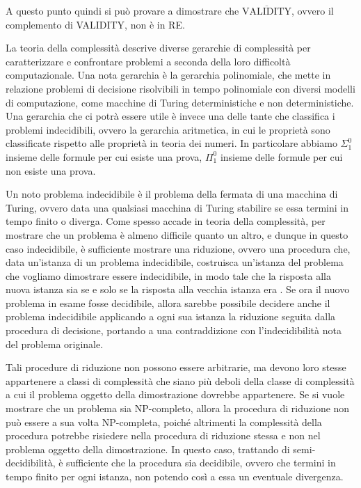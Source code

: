 A questo punto quindi si può provare a dimostrare che \(\overline{\text{VALIDITY}}\), ovvero il complemento di VALIDITY, non è in RE\@.

La teoria della complessità descrive diverse gerarchie di complessità per caratterizzare e confrontare problemi a seconda della loro difficoltà computazionale. Una nota gerarchia è la gerarchia polinomiale, che mette in relazione problemi di decisione risolvibili in tempo polinomiale con diversi modelli di computazione, come macchine di Turing deterministiche e non deterministiche. Una gerarchia che ci potrà essere utile è invece una delle tante che classifica i problemi indecidibili, ovvero la gerarchia aritmetica, in cui le proprietà sono classificate rispetto alle proprietà in teoria dei numeri. In particolare abbiamo \(\Sigma_1^0\) insieme delle formule per cui esiste una prova, \(\Pi_1^0\) insieme delle formule per cui non esiste una prova.

Un noto problema indecidibile è il problema della fermata di una macchina di Turing, ovvero data una qualsiasi macchina di Turing stabilire se essa termini in tempo finito o diverga. Come spesso accade in teoria della complessità, per mostrare che un problema è almeno difficile quanto un altro, e dunque in questo caso indecidibile, è sufficiente mostrare una riduzione, ovvero una procedura che, data un'istanza di un problema indecidibile, costruisca un'istanza del problema che vogliamo dimostrare essere indecidibile, in modo tale che la risposta alla nuova istanza sia  se e solo se la risposta alla vecchia istanza era . Se ora il nuovo problema in esame fosse decidibile, allora sarebbe possibile decidere anche il problema indecidibile applicando a ogni sua istanza la riduzione seguita dalla procedura di decisione, portando a una contraddizione con l'indecidibilità nota del problema originale. 

Tali procedure di riduzione non possono essere arbitrarie, ma devono loro stesse appartenere a classi di complessità che siano più deboli della classe di complessità a cui il problema oggetto della dimostrazione dovrebbe appartenere. Se si vuole mostrare che un problema sia NP-completo, allora la procedura di riduzione non può essere a sua volta NP-completa, poiché altrimenti la complessità della procedura potrebbe risiedere nella procedura di riduzione stessa e non nel problema oggetto della dimostrazione. In questo caso, trattando di semi-decidibilità, è sufficiente che la procedura sia decidibile, ovvero che termini in tempo finito per ogni istanza, non potendo così  a essa un eventuale divergenza.

